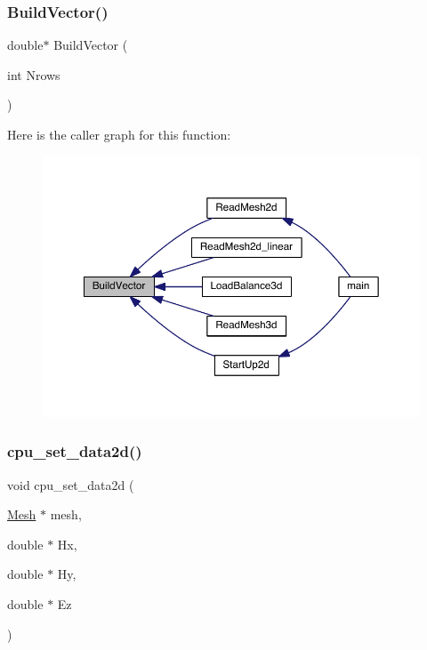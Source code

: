 \subsubsection{\texorpdfstring{Build\+Vector()}{BuildVector()}}
{\footnotesize\ttfamily double$\ast$ Build\+Vector (\begin{DoxyParamCaption}\item[{int}]{Nrows }\end{DoxyParamCaption})}

Here is the caller graph for this function\+:\nopagebreak
\begin{figure}[H]
\begin{center}
\leavevmode
\includegraphics[width=350pt]{a00554_a990278305dbeaf8e4441cf4146bfdc62_icgraph}
\end{center}
\end{figure}
\mbox{\label{a00554_ac36fe1f22177bd96a5c69239eee6ad30}} 
\subsubsection{\texorpdfstring{cpu\+\_\+set\+\_\+data2d()}{cpu\_set\_data2d()}}
{\footnotesize\ttfamily void cpu\+\_\+set\+\_\+data2d (\begin{DoxyParamCaption}\item[{\hyperlink{a00557_aeffbe0891ab73a4d8964c9cb7978426e}{Mesh} $\ast$}]{mesh,  }\item[{double $\ast$}]{Hx,  }\item[{double $\ast$}]{Hy,  }\item[{double $\ast$}]{Ez }\end{DoxyParamCaption})}

